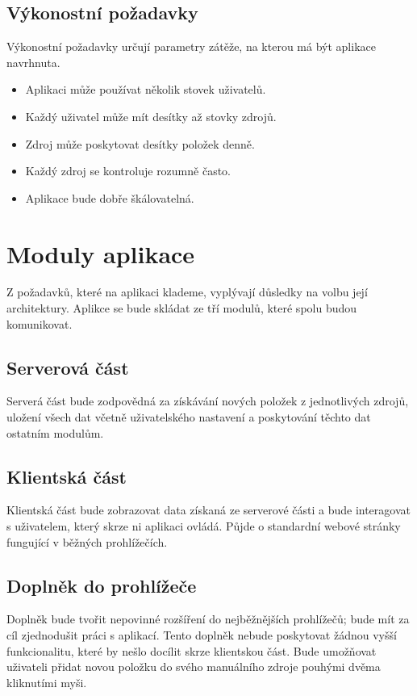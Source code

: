 \subsection{Výkonostní požadavky}

Výkonostní požadavky určují parametry zátěže, na kterou má být aplikace navrhnuta.

\begin{itemize}
	\item Aplikaci může používat několik stovek uživatelů.
    \item Každý uživatel může mít desítky až stovky zdrojů.
	\item Zdroj může poskytovat desítky položek denně.
    \item Každý zdroj se kontroluje rozumně často.
    \item Aplikace bude dobře škálovatelná.
\end{itemize}

\section{Moduly aplikace}

Z požadavků, které na aplikaci klademe, vyplývají důsledky na volbu její architektury.
Aplikce se bude skládat ze tří modulů, které spolu budou komunikovat.


\subsection{Serverová část}

Serverá část bude zodpovědná za získávání nových položek z jednotlivých zdrojů, uložení všech dat včetně uživatelského nastavení a poskytování těchto dat ostatním modulům.

\subsection{Klientská část}

Klientská část bude zobrazovat data získaná ze serverové části a bude interagovat s uživatelem, který skrze ni aplikaci ovládá.
Půjde o standardní webové stránky fungující v běžných prohlížečích.

\subsection{Doplněk do prohlížeče}

Doplněk bude tvořit nepovinné rozšíření do nejběžnějších prohlížečů; bude mít za cíl zjednodušit práci s aplikací.
Tento doplněk nebude poskytovat žádnou vyšší funkcionalitu, které by nešlo docílit skrze klientskou část.
Bude umožňovat uživateli přidat novou položku do svého manuálního zdroje pouhými dvěma kliknutími myši.

